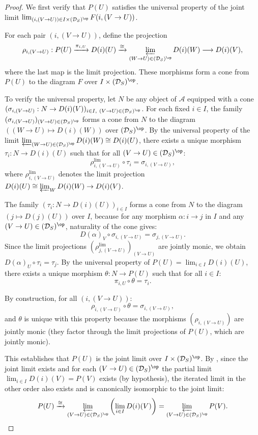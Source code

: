 \begin{proof}
We first verify that $P(U)$ satisfies the universal property of the joint limit $\lim_{(i, (V\to U)) \in I \times (\mathcal{D}_S)^{\op}} F(i, (V\to U))$.

For each pair $(i, (V \to U))$, define the projection
\[
\rho_{i,(V\to U)}: P(U) \xrightarrow{\pi_{i,U}} D(i)(U) \xrightarrow{\cong} \varprojlim_{(W \to U) \in (\mathcal{D}_S)^{\op}} D(i)(W) \longrightarrow D(i)(V),
\]
where the last map is the limit projection. These morphisms form a cone from $P(U)$ to the diagram $F$ over $I \times (\mathcal{D}_S)^{\op}$.

To verify the universal property, let $N$ be any object of $\mathcal{A}$ equipped with a cone $(\sigma_{i,(V\to U)}: N \to D(i)(V))_{i \in I,\ (V\to U) \in (\mathcal{D}_S)^{\op}}$. For each fixed $i \in I$, the family $(\sigma_{i,(V\to U)})_{(V\to U) \in (\mathcal{D}_S)^{\op}}$ forms a cone from $N$ to the diagram $((W\to U) \mapsto D(i)(W))$ over $(\mathcal{D}_S)^{\op}$. By the universal property of the limit $\varprojlim_{(W\to U) \in (\mathcal{D}_S)^{\op}} D(i)(W) \cong D(i)(U)$, there exists a unique morphism $\tau_i: N \to D(i)(U)$ such that for all $(V\to U) \in (\mathcal{D}_S)^{\op}$:
\[
\rho_{i,(V\to U)}^{\text{lim}} \circ \tau_i = \sigma_{i,(V\to U)},
\]
where $\rho_{i,(V\to U)}^{\text{lim}}$ denotes the limit projection $D(i)(U) \cong \varprojlim_W D(i)(W) \to D(i)(V)$.

The family $(\tau_i: N \to D(i)(U))_{i \in I}$ forms a cone from $N$ to the diagram $(j \mapsto D(j)(U))$ over $I$, because for any morphism $\alpha: i \to j$ in $I$ and any $(V\to U) \in (\mathcal{D}_S)^{\op}$, naturality of the cone gives:
\[
D(\alpha)_V \circ \sigma_{i,(V\to U)} = \sigma_{j,(V\to U)}.
\]
Since the limit projections $(\rho_{j,(V\to U)}^{\text{lim}})_{(V\to U)}$ are jointly monic, we obtain $D(\alpha)_U \circ \tau_i = \tau_j$. By the universal property of $P(U) = \lim_{i \in I} D(i)(U)$, there exists a unique morphism $\theta: N \to P(U)$ such that for all $i \in I$:
\[
\pi_{i,U} \circ \theta = \tau_i.
\]

By construction, for all $(i, (V\to U))$:
\[
\rho_{i,(V\to U)} \circ \theta = \sigma_{i,(V\to U)},
\]
and $\theta$ is unique with this property because the morphisms $(\rho_{i,(V\to U)})$ are jointly monic (they factor through the limit projections of $P(U)$, which are jointly monic).

This establishes that $P(U)$ is the joint limit over $I \times (\mathcal{D}_S)^{\op}$. By , since the joint limit exists and for each $(V\to U) \in (\mathcal{D}_S)^{\op}$ the partial limit $\lim_{i \in I} D(i)(V) = P(V)$ exists (by hypothesis), the iterated limit in the other order also exists and is canonically isomorphic to the joint limit:
\[
P(U) \xrightarrow{\cong} \varprojlim_{(V \to U) \in (\mathcal{D}_S)^{\op}} \left( \lim_{i \in I} D(i)(V) \right) = \varprojlim_{(V \to U) \in (\mathcal{D}_S)^{\op}} P(V).
\]


\end{proof}
